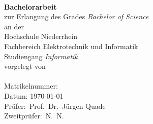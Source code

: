 \begin{titlepage}
	
\begin{center}
		\textbf{\Large \thesisTitle}\\[3cm]
		\textbf{Bachelorarbeit}\\
		zur Erlangung des Grades {\em Bachelor of Science}\\[1.5cm]
		
		an der\\
		Hochschule Niederrhein\\
		Fachbereich Elektrotechnik und Informatik\\
		Studiengang {\em Informatik}\\[3cm]
		
		vorgelegt von\\
		\thesisAuthor\\
		Matrikelnummer: \Matrikelnummer\\[3cm]
		Datum: \today\\[3cm]
		
		Prüfer:~Prof.~Dr.~Jürgen Quade\\
		Zweitprüfer:~N.~N.
	\end{center}
\end{titlepage}